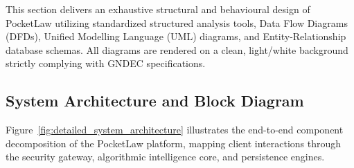 This section delivers an exhaustive structural and behavioural design of PocketLaw utilizing standardized structured analysis tools, Data Flow Diagrams (DFDs), Unified Modelling Language (UML) diagrams, and Entity-Relationship database schemas. All diagrams are rendered on a clean, light/white background strictly complying with GNDEC specifications.

\subsection{System Architecture and Block Diagram}
Figure~\ref{fig:detailed_system_architecture} illustrates the end-to-end component decomposition of the PocketLaw platform, mapping client interactions through the security gateway, algorithmic intelligence core, and persistence engines.

